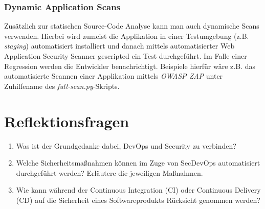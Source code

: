 \subsubsection{Dynamic Application Scans}

Zusätzlich zur statischen Source-Code Analyse kann man auch dynamische Scans verwenden. Hierbei wird zumeist die Applikation in einer Testumgebung (z.B. \textit{staging}) automatisiert installiert und danach mittels automatisierter Web Application Security Scanner gescripted ein Test durchgeführt. Im Falle einer Regression werden die Entwickler benachrichtigt. Beispiele hierfür wäre z.B. das automatisierte Scannen einer Applikation mittels \textit{OWASP ZAP} unter Zuhilfename des \textit{full-scan.py}-Skripts.

\section{Reflektionsfragen}

\begin{enumerate}
	\item Was ist der Grundgedanke dabei, DevOps und Security zu verbinden?
	\item Welche Sicherheitsmaßnahmen können im Zuge von SecDevOps automatisiert durchgeführt werden? Erläutere die jeweiligen Maßnahmen.
	\item Wie kann während der Continuous Integration (CI) oder Continuous Delivery (CD) auf die Sicherheit eines Softwareprodukts Rücksicht genommen werden?
\end{enumerate}
